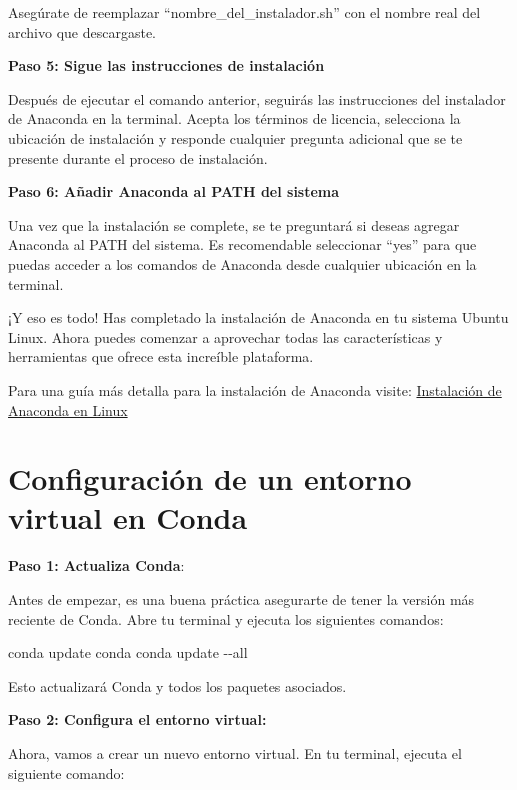 \documentclass[
  jou,
  floatsintext,
  longtable,
  a4paper,
  nolmodern,
  notxfonts,
  notimes,
  colorlinks=true,linkcolor=blue,citecolor=blue,urlcolor=blue]{apa7}
\newenvironment{Shaded}{\begin{snugshade}}{\end{snugshade}}
\newcommand{\AttributeTok}[1]{\textcolor[rgb]{0.40,0.45,0.13}{#1}}
\newcommand{\ExtensionTok}[1]{\textcolor[rgb]{0.00,0.23,0.31}{#1}}
\newcommand{\NormalTok}[1]{\textcolor[rgb]{0.00,0.23,0.31}{#1}}
\begin{document}
Asegúrate de reemplazar ``nombre\_del\_instalador.sh'' con el nombre
real del archivo que descargaste.

\textbf{Paso 5: Sigue las instrucciones de instalación}

Después de ejecutar el comando anterior, seguirás las instrucciones del
instalador de Anaconda en la terminal. Acepta los términos de licencia,
selecciona la ubicación de instalación y responde cualquier pregunta
adicional que se te presente durante el proceso de instalación.

\textbf{Paso 6: Añadir Anaconda al PATH del sistema}

Una vez que la instalación se complete, se te preguntará si deseas
agregar Anaconda al PATH del sistema. Es recomendable seleccionar
``yes'' para que puedas acceder a los comandos de Anaconda desde
cualquier ubicación en la terminal.

¡Y eso es todo! Has completado la instalación de Anaconda en tu sistema
Ubuntu Linux. Ahora puedes comenzar a aprovechar todas las
características y herramientas que ofrece esta increíble plataforma.

Para una guía más detalla para la instalación de Anaconda visite:
\href{../2023-06-19-instalacion-de-anaconda/index.qmd}{Instalación de
Anaconda en Linux}

\section{Configuración de un entorno virtual en
Conda}\label{configuraciuxf3n-de-un-entorno-virtual-en-conda}

\textbf{Paso 1: Actualiza Conda}:

Antes de empezar, es una buena práctica asegurarte de tener la versión
más reciente de Conda. Abre tu terminal y ejecuta los siguientes
comandos:

\begin{Shaded}
\begin{Highlighting}[]
\ExtensionTok{conda}\NormalTok{ update conda}
\ExtensionTok{conda}\NormalTok{ update }\AttributeTok{{-}{-}all}
\end{Highlighting}
\end{Shaded}

Esto actualizará Conda y todos los paquetes asociados.

\textbf{Paso 2: Configura el entorno virtual:}

Ahora, vamos a crear un nuevo entorno virtual. En tu terminal, ejecuta
el siguiente comando:
\end{document}

